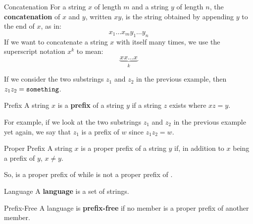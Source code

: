 \documentclass[letterpaper]{article}
\begin{document}
\begin{definition}{Concatenation}{}
    For a string $x$ of length $m$ and a string $y$ of length $n$, the \textbf{concatenation} of $x$ and $y$, written $xy$, is the string obtained by appending $y$ to the end of $x$, as in: 
    \[x_1 \dots x_m y_1 \dots y_n\]
    If we want to concatenate a string $x$ with itself many times, we use the superscript notation $x^k$ to mean: 
    \[\underbrace{xx \dots x}_{k}\]
\end{definition}
If we consider the two substrings $z_1$ and $z_2$ in the previous example, then $z_1 z_2 = \texttt{something}$. 

\begin{definition}{Prefix}{}
    A string $x$ is a \textbf{prefix} of a string $y$ if a string $z$ exists where $xz = y$.
\end{definition}
For example, if we look at the two substrings $z_1$ and $z_2$ in the previous example yet again, we say that $z_1$ is a prefix of $w$ since $z_1 z_2 = w$. 

\begin{definition}{Proper Prefix}{}
    A string $x$ is a proper prefix of a string $y$ if, in addition to $x$ being a prefix of $y$, $x \neq y$.
\end{definition}
So,  is a proper prefix of  while  is not a proper prefix of .

\begin{definition}{Language}{}
    A \textbf{language} is a set of strings. 
\end{definition}

\begin{definition}{Prefix-Free}{}
    A language is \textbf{prefix-free} if no member is a proper prefix of another member.
\end{definition}























\newpage 
\end{document}

